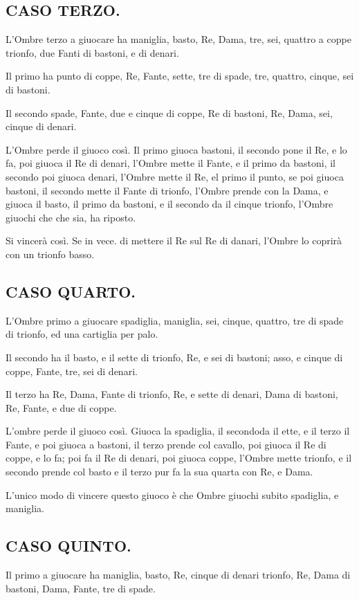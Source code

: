 \documentclass[11pt,a6paper]{article}
\begin{document}
\subsection{CASO TERZO.}
L'Ombre terzo a giuocare ha maniglia,
basto, Re, Dama, tre, sei, quattro a
coppe trionfo, due Fanti di bastoni, e di denari.

Il primo ha punto di coppe, Re, Fante,
sette, tre di spade, tre, quattro, cinque, sei
di bastoni.

Il secondo spade, Fante, due e cinque
di coppe, Re di bastoni, Re, Dama, sei,
cinque di denari.

L'Ombre perde il giuoco così. Il primo
giuoca bastoni, il secondo pone il Re, e lo fa,
poi giuoca il Re di denari, l'Ombre mette il
Fante, e il primo da bastoni, il secondo poi
giuoca denari, l'Ombre mette il Re, el primo
il punto, se poi giuoca bastoni, il secondo
mette il Fante di trionfo, l'Ombre prende
con la Dama, e giuoca il basto, il primo da
bastoni, e il secondo da il cinque trionfo,
l'Ombre giuochi che che sia, ha riposto.

Si vincerà così. Se in vece. di mettere il
Re sul Re di danari, l'Ombre lo coprirà con
un trionfo basso.

\subsection{CASO QUARTO.}
L'Ombre primo a giuocare spadiglia, maniglia,
sei, cinque, quattro, tre di spade
di trionfo, ed una cartiglia per palo.

Il secondo ha il basto, e il sette di trionfo,
Re, e sei di bastoni; asso, e cinque di
coppe, Fante, tre, sei di denari.

Il terzo ha Re, Dama, Fante di trionfo,
Re, e sette di denari, Dama di bastoni, Re,
Fante, e due di coppe.

L'ombre perde il giuoco così. Giuoca la
spadiglia, il secondoda il ette, e il terzo il
Fante, e poi giuoca a bastoni, il terzo prende
col cavallo, poi giuoca il Re di coppe, e lo
fa; poi fa il Re di denari, poi giuoca coppe,
l'Ombre mette trionfo, e il secondo prende
col basto e il terzo pur fa la sua quarta con
Re, e Dama.

L'unico modo di vincere questo giuoco è
che Ombre giuochi subito spadiglia, e maniglia.
\subsection{CASO QUINTO.}

Il primo a giuocare ha maniglia, basto,
Re, cinque di denari trionfo, Re, Dama
di bastoni, Dama, Fante, tre di spade.
\end{document}
